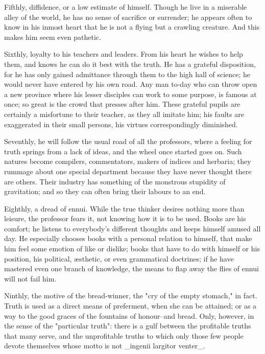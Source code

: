 Fifthly, diffidence, or a low estimate of himself. Though he live in
a miserable alley of the world, he has no sense of sacrifice or
surrender; he appears often to know in his inmost heart that he is
not a flying but a crawling creature. And this makes him seem even
pathetic.

Sixthly, loyalty to his teachers and leaders. From his heart he
wishes to help them, and knows he can do it best with the truth. He
has a grateful disposition, for he has only gained admittance through
them to the high hall of science; he would never have entered by his
own road. Any man to-day who can throw open a new province where his
lesser disciples can work to some purpose, is famous at once; so
great is the crowd that presses after him. These grateful pupils are
certainly a misfortune to their teacher, as they all imitate him; his
faults are exaggerated in their small persons, his virtues
correspondingly diminished.

Seventhly, he will follow the usual road of all the professors, where
a feeling for truth springs from a lack of ideas, and the wheel once
started goes on. Such natures become compilers, commentators, makers
of indices and herbaria; they rummage about one special department
because they have never thought there are others. Their industry has
something of the monstrous stupidity of gravitation; and so they can
often bring their labours to an end.

Eighthly, a dread of ennui. While the true thinker desires nothing
more than leisure, the professor fears it, not knowing how it is to
be used. Books are his comfort; he listens to everybody's different
thoughts and keeps himself amused all day. He especially chooses
books with a personal relation to himself, that make him feel some
emotion of like or dislike; books that have to do with himself or his
position, his political, æsthetic, or even grammatical doctrines; if
he have mastered even one branch of knowledge, the means to flap away
the flies of ennui will not fail him.

Ninthly, the motive of the bread-winner, the "cry of the empty
stomach," in fact. Truth is used as a direct means of preferment,
when she can be attained; or as a way to the good graces of the
fountains of honour--and bread. Only, however, in the sense of the
"particular truth": there is a gulf between the profitable truths
that many serve, and the unprofitable truths to which only those few
people devote themselves whose motto is not _ingenii largitor
venter_.

